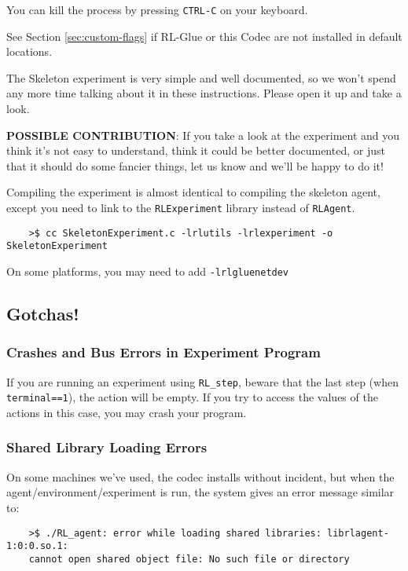 \documentclass[11pt]{article}
\begin{document}
You can kill the process by pressing \texttt{CTRL-C} on your keyboard.

See Section \ref{sec:custom-flags} if RL-Glue or this Codec are not installed in default locations.

The Skeleton experiment is very simple and well documented, so we won't spend any more time talking about it in these instructions.
Please open it up and take a look.

\textbf{POSSIBLE CONTRIBUTION}: If you take a look at the experiment and you think it's not easy to understand, think it could be better documented, 
or just that it should do some fancier things, let us know and we'll be happy to do it!

Compiling the experiment is almost identical to compiling the skeleton agent, except you need to link to the \texttt{RLExperiment} library instead of \texttt{RLAgent}.
\begin{verbatim}
	>$ cc SkeletonExperiment.c -lrlutils -lrlexperiment -o SkeletonExperiment
\end{verbatim}

On some platforms, you may need to add \texttt{-lrlgluenetdev}

\subsection{Gotchas!}
\subsubsection{Crashes and Bus Errors in Experiment Program}
If you are running an experiment using \texttt{RL\_step}, beware that the last step (when \texttt{terminal==1}), the action will be empty.  If you try to access the values of the actions in this 
case, you may crash your program.

\subsubsection{Shared Library Loading Errors}
\label{sec:gotchas-shared-libs}
On some machines we've used, the codec installs without incident, but when the agent/environment/experiment is run, the system gives an error message similar to:
\begin{verbatim}
	>$ ./RL_agent: error while loading shared libraries: librlagent-1:0:0.so.1:
	cannot open shared object file: No such file or directory
\end{verbatim}
\end{document}
